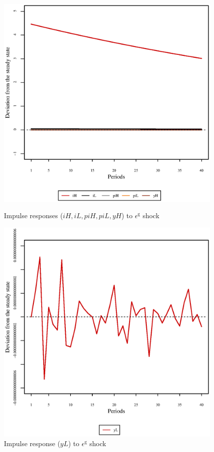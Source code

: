\begin{figure}[h]
\begin{minipage}{0.5\textwidth}
\vspace*{-3em}
\centering
\includegraphics[width=0.99\textwidth, scale=0.55]{plots/plot_3.eps}
\caption{Impulse responses (${i\!H}, {i\!L}, {p\!i\!H}, {p\!i\!L}, {y\!H}$) to $\epsilon^{\mathrm{g}}$ shock}
\end{minipage}
\begin{minipage}{0.5\textwidth}
\vspace*{-3em}
\centering
\includegraphics[width=0.99\textwidth, scale=0.55]{plots/plot_4.eps}
\caption{Impulse response (${y\!L}$) to $\epsilon^{\mathrm{g}}$ shock}
\end{minipage}
\end{figure}

\pagebreak



